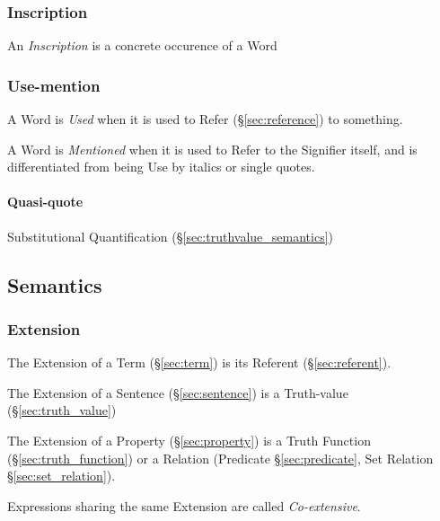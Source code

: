 \subsubsection{Inscription}\label{sec:inscription}

An \emph{Inscription} is a concrete occurence of a Word



\subsubsection{Use-mention}\label{sec:use_mention}

A Word is \emph{Used} when it is used to Refer (\S\ref{sec:reference})
to something.

A Word is \emph{Mentioned} when it is used to Refer to the Signifier
itself, and is differentiated from being Use by italics or single
quotes.



\paragraph{Quasi-quote}\label{sec:quasi_quote}\hfill

Substitutional Quantification (\S\ref{sec:truthvalue_semantics})



\subsection{Semantics}\label{sec:semantics}

\subsubsection{Extension}\label{sec:extension}\cite{chalmers02}

The Extension of a Term (\S\ref{sec:term}) is its Referent
(\S\ref{sec:referent}).

The Extension of a Sentence (\S\ref{sec:sentence}) is a Truth-value
(\S\ref{sec:truth_value})

The Extension of a Property (\S\ref{sec:property}) is a Truth Function
(\S\ref{sec:truth_function}) or a Relation (Predicate
\S\ref{sec:predicate}, Set Relation \S\ref{sec:set_relation}).

Expressions sharing the same Extension are called \emph{Co-extensive}.



